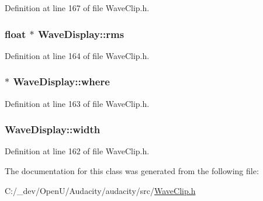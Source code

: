 Definition at line 167 of file Wave\+Clip.\+h.

\subsubsection[{\texorpdfstring{rms}{rms}}]{\setlength{\rightskip}{0pt plus 5cm}float $\ast$ Wave\+Display\+::rms}\hypertarget{class_wave_display_a75d667998a5aa1ec03d1ec86b80f1392}{}\label{class_wave_display_a75d667998a5aa1ec03d1ec86b80f1392}


Definition at line 164 of file Wave\+Clip.\+h.

\subsubsection[{\texorpdfstring{where}{where}}]{$\ast$ Wave\+Display\+::where}\hypertarget{class_wave_display_a7e072e884092ea939899822b0d92b8be}{}\label{class_wave_display_a7e072e884092ea939899822b0d92b8be}


Definition at line 163 of file Wave\+Clip.\+h.

\subsubsection[{\texorpdfstring{width}{width}}]{ Wave\+Display\+::width}\hypertarget{class_wave_display_aab0a13074ebb8ed5ba1da2bceaddd407}{}\label{class_wave_display_aab0a13074ebb8ed5ba1da2bceaddd407}


Definition at line 162 of file Wave\+Clip.\+h.



The documentation for this class was generated from the following file\+:\begin{DoxyCompactItemize}
\item 
C\+:/\+\_\+dev/\+Open\+U/\+Audacity/audacity/src/\hyperlink{_wave_clip_8h}{Wave\+Clip.\+h}\end{DoxyCompactItemize}
